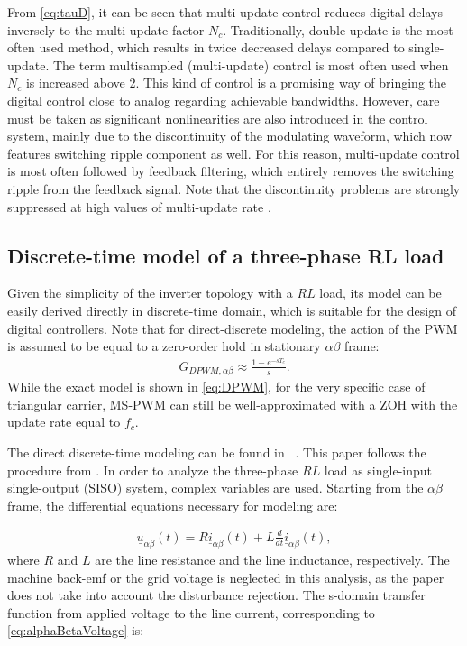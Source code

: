 \documentclass[conference]{IEEEtran}
\begin{document}
From \eqref{eq:tauD}, it can be seen that multi-update control reduces digital delays inversely to the multi-update factor $N_c$. Traditionally, double-update is the most often used method, which results in twice decreased delays compared to single-update.
The term multisampled (multi-update) control is most often used when $N_c$ is increased above 2. This kind of control is a promising way of bringing the digital control close to analog regarding achievable bandwidths. However, care must be taken as significant nonlinearities are also introduced in the control system, mainly due to the discontinuity of the modulating waveform, which now features switching ripple component as well. For this reason, multi-update control is most often followed by feedback filtering, which entirely removes the switching ripple from the feedback signal. Note that the discontinuity problems are strongly suppressed at high values of multi-update rate \cite{corradini2018}.

\subsection{Discrete-time model of a three-phase RL load}

Given the simplicity of the inverter topology with a $RL$ load, its model can be easily derived directly in discrete-time domain, which is suitable for the design of digital controllers. Note that for direct-discrete modeling, the action of the PWM is assumed to be equal to a zero-order hold in stationary $\alpha \beta$ frame:
\begin{equation}
\begin{aligned}
G_{DPWM,\alpha \beta} \approx \frac{1-e^{-sT_c}}{s}.
\label{eq:DPWMAlphaBeta} 
\end{aligned}    
\end{equation}
While the exact model is shown in \eqref{eq:DPWM}, for the very specific case of triangular carrier, MS-PWM can still be well-approximated with a ZOH with the update rate equal to $f_c$.

The direct discrete-time modeling can be found in ~\cite{lorenz2010,vuksa2016,commentsHoffmann}. This paper follows the procedure from \cite{commentsHoffmann}.
In order to analyze the three-phase $RL$ load as single-input single-output (SISO) system, complex variables are used. 
Starting from the $\alpha \beta$ frame, the differential equations necessary for modeling are:

\begin{equation}
\begin{aligned}
\underline{u}_{\alpha \beta} (t) = R \underline{i}_{\alpha \beta} (t) + L \frac{d}{dt} \underline{i}_{\alpha \beta} (t),
\label{eq:alphaBetaVoltage} 
\end{aligned}    
\end{equation}
where $R$ and $L$ are the line resistance and the line inductance, respectively. The machine back-emf or the grid voltage is neglected in this analysis, as the paper does not take into account the disturbance rejection.
The s-domain transfer function from applied voltage to the line current, corresponding to \eqref{eq:alphaBetaVoltage} is:
\end{document}
